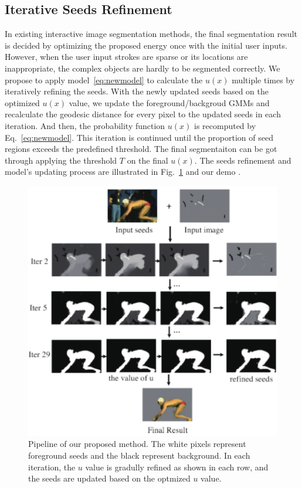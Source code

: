 \documentclass{article}
\begin{document}
\subsection{Iterative Seeds Refinement}
%
In existing interactive image segmentation methods, the final segmentation result is decided by optimizing the proposed energy once with the initial user inputs. However, when the user input strokes are sparse or its locations are inappropriate, the complex objects are hardly to be segmented correctly. We propose to apply model~\eqref{eq:newmodel} to calculate the $u(x)$ multiple times by iteratively refining the seeds. With the newly updated seeds based on the optimized $u(x)$ value, we update the foreground/backgroud GMMs and recalculate the geodesic distance for every pixel to the updated seeds in each iteration. And then, the probability function $u(x)$ is recomputed by Eq.~\eqref{eq:newmodel}. This iteration is continued until the proportion of seed regions exceeds the predefined threshold. The final segmentaiton can be got through applying the threshold $T$ on the final $u(x)$. The seeds refinement and model's updating process are illustrated in Fig.~\ref{fig:pipeline} and our demo \cite{demo}.
\begin{figure}[t]
\begin{center}
\includegraphics[width=0.8\linewidth]{Figures/pipe.pdf}
\end{center}
\vspace{-2em}
   \caption{Pipeline of our proposed method. The white pixels represent foreground seeds and the black represent background. In each iteration, the $u$ value is gradully refined as shown in each row, and the seeds are updated based on the optmized $u$ value.}
\label{fig:pipeline}
\end{figure}
\end{document}
